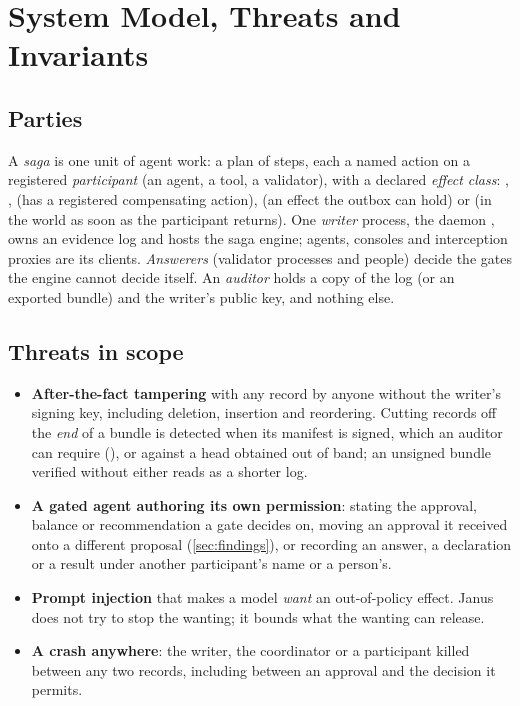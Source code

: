 \section{System Model, Threats and Invariants}
\label{sec:model}

\subsection{Parties}
A \emph{saga} is one unit of agent work: a plan of steps, each a named action on
a registered \emph{participant} (an agent, a tool, a validator), with a declared
\emph{effect class}: , ,  (has a
registered compensating action),  (an effect the
outbox can hold) or  (in the world as soon as the
participant returns). One \emph{writer} process, the daemon
, owns an evidence log and hosts the saga engine; agents,
consoles and interception proxies are its clients. \emph{Answerers} (validator
processes and people) decide the gates the engine cannot decide itself. An
\emph{auditor} holds a copy of the log (or an exported bundle) and the writer's
public key, and nothing else.

\subsection{Threats in scope}
\begin{itemize}
\item \textbf{After-the-fact tampering} with any record by anyone without the
  writer's signing key, including deletion, insertion and reordering. Cutting
  records off the \emph{end} of a bundle is detected when its manifest is signed,
  which an auditor can require (), or against a
  head obtained out of band; an unsigned bundle verified without either reads as
  a shorter log.
\item \textbf{A gated agent authoring its own permission}: stating the approval,
  balance or recommendation a gate decides on, moving an approval it received
  onto a different proposal (\cref{sec:findings}), or recording an answer, a
  declaration or a result under another participant's name or a person's.
\item \textbf{Prompt injection} that makes a model \emph{want} an out-of-policy
  effect. Janus does not try to stop the wanting; it bounds what the wanting can
  release.
\item \textbf{A crash anywhere}: the writer, the coordinator or a participant
  killed between any two records, including between an approval and the decision
  it permits.
\end{itemize}

